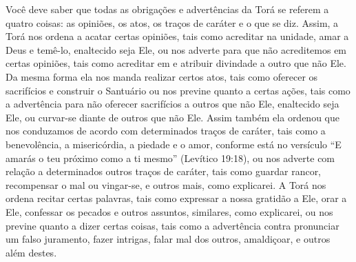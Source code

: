 Você deve saber que todas as obrigações e advertências da Torá se
referem a quatro coisas: as opiniões, os atos, os traços de caráter e o
que se diz. Assim, a Torá nos ordena a acatar certas opiniões, tais
como acreditar na unidade, amar a Deus e temê-lo, enaltecido seja Ele,
ou nos adverte para que não acreditemos em certas opiniões, tais como
acreditar em e atribuir divindade a outro que não Ele. Da mesma forma
ela nos manda realizar certos atos, tais como oferecer os sacrifícios e
construir o Santuário ou nos previne quanto a certas ações, tais como a
advertência para não oferecer sacrifícios a outros que não Ele,
enaltecido seja Ele, ou curvar-se diante de outros que não Ele. Assim
também ela ordenou que nos conduzamos de acordo com determinados traços
de caráter, tais como a benevolência, a misericórdia, a piedade e o
amor, conforme está no versículo ``E amarás o teu próximo como a ti
mesmo'' (Levítico 19:18), ou nos adverte com relação a determinados
outros traços de caráter, tais como guardar rancor, recompensar o mal
ou vingar-se, e outros mais, como explicarei. A Torá nos ordena recitar
certas palavras, tais como expressar a nossa gratidão a Ele, orar a
Ele, confessar os pecados e outros assuntos,
similares, como explicarei, ou nos previne quanto a dizer certas coisas,
tais como a advertência contra pronunciar um falso juramento, fazer
intrigas, falar mal dos outros, amaldiçoar, e outros além destes.

